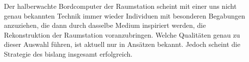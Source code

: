 \begin{newstuff}
    Der halberwachte Bordcomputer der Raumstation scheint mit einer uns nicht genau bekannten Technik immer wieder Individuen mit besonderen Begabungen anzuziehen, die dann durch dasselbe Medium inspiriert werden, die Rekonstruktion der Raumstation voranzubringen. Welche Qualitäten genau zu dieser Auswahl führen, ist aktuell nur in Ansätzen bekannt. Jedoch scheint die Strategie des  bislang insgesamt erfolgreich.
\end{newstuff}


    

